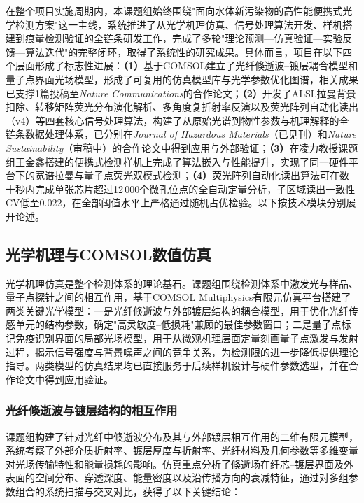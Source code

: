 \documentclass[12pt,a4paper]{article}
\begin{document}
在整个项目实施周期内，本课题组始终围绕"面向水体新污染物的高性能便携式光学检测方案"这一主线，系统推进了从光学机理仿真、信号处理算法开发、样机搭建到痕量检测验证的全链条研发工作，完成了多轮"理论预测—仿真验证—实验反馈—算法迭代"的完整闭环，取得了系统性的研究成果。具体而言，项目在以下四个层面形成了标志性进展：\textbf{（1）}基于COMSOL建立了光纤倏逝波--镀层耦合模型和量子点界面光场模型，形成了可复用的仿真模型库与光学参数优化图谱，相关成果已支撑1篇投稿至\textit{Nature Communications}的合作论文；\textbf{（2）}开发了ALSL拉曼背景扣除、转移矩阵荧光分布演化解析、多角度复折射率反演以及荧光阵列自动化读出（v4）等四套核心信号处理算法，构建了从原始光谱到物性参数与机理解释的全链条数据处理体系，已分别在\textit{Journal of Hazardous Materials}（已见刊）和\textit{Nature Sustainability}（审稿中）的合作论文中得到应用与外部验证；\textbf{（3）}在凌力教授课题组王金鑫搭建的便携式检测样机上完成了算法嵌入与性能提升，实现了同一硬件平台下的宽谱拉曼与量子点荧光双模式检测；\textbf{（4）}荧光阵列自动化读出算法可在数十秒内完成单张芯片超过12\,000个微孔位点的全自动定量分析，子区域读出一致性CV低至0.022，在全部阈值水平上严格通过随机占优检验。以下按技术模块分别展开论述。

\subsection{光学机理与COMSOL数值仿真}

光学机理仿真是整个检测体系的理论基石。课题组围绕检测体系中激发光与样品、量子点探针之间的相互作用，基于COMSOL Multiphysics有限元仿真平台搭建了两类关键光学模型：一是光纤倏逝波与外部镀层结构的耦合模型，用于优化光纤传感单元的结构参数，确定"高灵敏度--低损耗"兼顾的最佳参数窗口；二是量子点标记免疫识别界面的局部光场模型，用于从微观机理层面定量刻画量子点激发与发射过程，揭示信号强度与背景噪声之间的竞争关系，为检测限的进一步降低提供理论指导。两类模型的仿真结果均已直接服务于后续样机设计与硬件参数选型，并在合作论文中得到应用验证。

\subsubsection{光纤倏逝波与镀层结构的相互作用}

课题组构建了针对光纤中倏逝波分布及其与外部镀层相互作用的二维有限元模型，系统考察了外部介质折射率、镀层厚度与折射率、光纤材料及几何参数等多维变量对光场传输特性和能量损耗的影响。仿真重点分析了倏逝场在纤芯--镀层界面及外表面的空间分布、穿透深度、能量密度以及沿传播方向的衰减特征，通过对多组参数组合的系统扫描与交叉对比，获得了以下关键结论：
\end{document}

